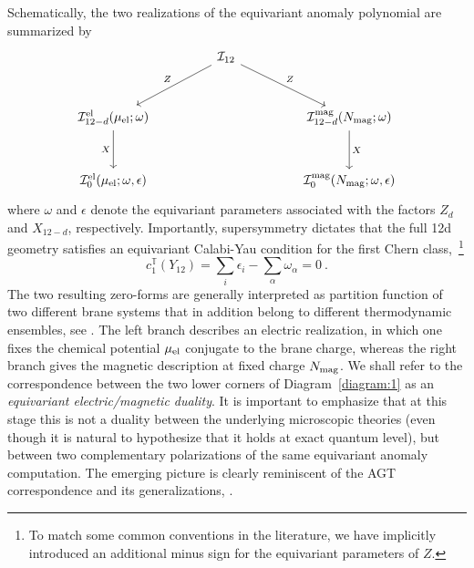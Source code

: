 \documentclass[11pt,a4paper]{article}
\def\cI{{\cal I}}
\theoremstyle{definition}
\theoremstyle{identity}
\theoremstyle{remark}
\newcommand{\be}{\begin{equation}}
\newcommand{\ee}{\end{equation}}
\newcommand{\e}{\epsilon}
\newcommand{\BT}{\mathbb{T}}
\begin{document}
Schematically, the two realizations of the equivariant anomaly polynomial are summarized by
\begin{equation}
\label{diagram:1}
\begin{tikzcd}[column sep=4.5em,row sep=3em]
& \cI_{12}
  \arrow[dl,"Z"']
  \arrow[dr,"Z"] & \\
\cI^{\rm el}_{12-d}(\mu_{\rm el};\omega)
  \arrow[d,"X"']
&&
\cI^{\rm mag}_{12-d}(N_{\rm mag};\omega)
  \arrow[d,"X"] \\
\cI^{\rm el}_{0}(\mu_{\rm el};\omega,\epsilon)
&&
\cI^{\rm mag}_{0}(N_{\rm mag};\omega,\epsilon)
\end{tikzcd}
\end{equation}
where $\omega$ and $\epsilon$ denote the equivariant parameters associated with the
factors $Z_d$ and $X_{12-d}$, respectively. Importantly, supersymmetry dictates that the full 12d geometry satisfies an equivariant Calabi-Yau condition for the first Chern class,~\footnote{To match some common conventions in the literature, we have implicitly introduced an additional minus sign for the equivariant parameters of $Z$.}
\be
\label{eq:susyintro}
    c_1^\BT (Y_{12}) = \sum_i \e_i - \sum_\alpha \omega_\alpha = 0\ .
\ee
The two resulting zero-forms are generally interpreted as partition function of two different brane systems that in addition belong to different thermodynamic ensembles, see \cite{Kurlyand:2022vzv,Beccaria:2023hhi,Gautason:2025plx,Bobev:2026gir}. The
left branch describes an electric realization, in which one fixes the chemical potential
$\mu_{\rm el}$ conjugate to the brane charge, whereas the right branch gives the magnetic
description at fixed charge $N_{\rm mag}$. We shall refer to the correspondence between the
two lower corners of Diagram~\eqref{diagram:1} as an \emph{equivariant
electric/magnetic duality}. It is important to emphasize that at this stage this is not a duality between
the underlying microscopic theories (even though it is natural to hypothesize that it holds at exact quantum level), but between two complementary polarizations of the same
equivariant anomaly computation. The emerging picture is clearly reminiscent of the AGT correspondence and its generalizations, \cite{Alday:2009aq,LeFloch:2020uop}.
\end{document}
